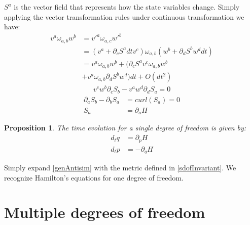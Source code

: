\documentclass[aps,pra,10pt,twocolumn,floatfix,nofootinbib]{revtex4-1}
\newtheorem{prop}[thm]{Proposition}
\theoremstyle{definition}
\begin{document}
$S^{a}$ is the vector field that represents how the state variables change. Simply applying the vector transformation rules under continuous transformation we have:
\begin{align*}
v^{a} \omega_{a, b} w^{b} &= v'^{a} \omega_{a, c} w'^{b}  \\
&= (v^{a} + \partial_{c} S^{a} dt v^{c}) \omega_{a, b} ( w^{b} + \partial_{d} S^{b} w^{d} dt) \\
&= v^{a} \omega_{a, b} w^{b} + (\partial_{c} S^{a} v^{c} \omega_{a, b} w^{b} \\
 &+ v^{a} \omega_{a, b} \partial_{d} S^{b} w^{d}) dt + O(dt^2)
\end{align*}
\begin{align*}
v^{c} w^{b} \partial_{c} S_{b} - v^{a} w^{d} \partial_{d} S_{a} = 0
\end{align*}
\begin{align*}
\partial_{a} S_{b} - \partial_{b} S_{a} &= curl(S_{a}) = 0 \\
S_{a} &= \partial_{a}H
\end{align*}

\begin{prop}\label{sdofHam}
The time evolution for a single degree of freedom is given by:
\begin{align*}
d_{t}q &= \partial_{p} H \\
d_{t}p &= - \partial_{q} H
\end{align*}
\end{prop}

Simply expand \ref{genAntisim} with the metric defined in \ref{sdofInvariant}. We recognize Hamilton's equations for one degree of freedom\cite{classical_dynamics}.

\section{Multiple degrees of freedom}
\end{document}
